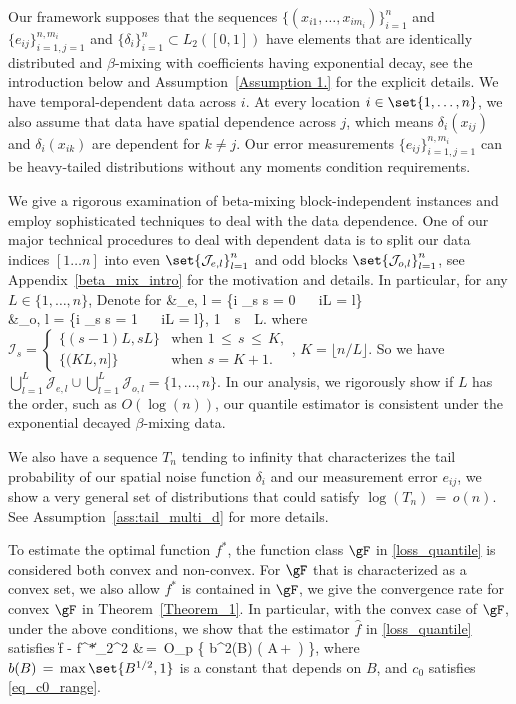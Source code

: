\documentclass[twoside,11pt]{article}
\begin{document}
Our framework supposes that the sequences $\{(x_{i1}, \dots, x_{im_i}) \}^{n}_{i=1}$ and $\{e_{ij}\}_{i=1,j=1}^{n,m_i}$ and $\{\delta_i\}_{i=1}^{n} \subset L_2([0,1])$ have elements that are identically distributed and $\beta$-mixing with coefficients having exponential decay, see the introduction below and Assumption~\ref{Assumption 1.} for the explicit details. We have temporal-dependent data across $i$. At every location $i \in \set{1, \dots, n}$, we also assume that data have spatial dependence across $j$, which means $\delta_i(x_{ij})$ and $\delta_i(x_{ik})$ are dependent for $k\neq j$.
Our error measurements $\{e_{ij}\}_{i=1,j=1}^{n,m_i}$ can be heavy-tailed distributions without any moments condition requirements. 

We give a rigorous examination
of beta-mixing block-independent instances and employ sophisticated techniques to deal with the data dependence. 
One of our major technical procedures to deal with dependent data is to split our data indices $[1\dots n]$ into even $\set{\mathcal{J}_{e,l}}_{l=1}^n$ and odd blocks $\set{\mathcal{J}_{o,l}}_{l=1}^n$, see Appendix~\ref{beta_mix_intro} for the motivation and details. 
In particular, for any \(L \in \{1, \ldots, n\}\), Denote for 
\beq
\label{odd_even_indices}
&_{e, l} = \{i \in {}_s  s = 0 \,\,\,\,\,\, i\mod L = l\} \,\,\,\,\,\, \\ 
&_{o, l} = \{i \in {}_s  s = 1 \,\,\,\,\,\, i\mod L = l\}, 1 \,\leq\, s \,\leq\, L. 
\beq 
where $
\mathcal{I}_s = 
\begin{cases}
\{ (s - 1)L, sL \} & \text{when } 1 \,\leq\, s \,\leq\, K, \\
\{ (KL, n] \} & \text{when } s = K + 1. \end{cases}
$, \(K = \lfloor n/L \rfloor\). So we have  
$\bigcup_{l=1}^L \mathcal{J}_{e,l} \cup \bigcup_{l=1}^L \mathcal{J}_{o,l} = \{1, \ldots, n\}.$ In our analysis, we rigorously show if $L$ has the order, such as $O(\log(n))$, our quantile estimator is consistent under the exponential decayed $\beta$-mixing data.  

We also have a sequence $T_n$ tending to infinity that characterizes the tail probability of our spatial noise function $\delta_i$ and our measurement error $e_{ij}$, we show a very general set of distributions that could satisfy $\log(T_n) \,=\, o(n)$. See Assumption~\ref{ass:tail_multi_d} for more details. 

To estimate the optimal function $f^*$, the function class $\gF$ in \eqref{loss_quantile} is considered both convex and non-convex. 
For $\gF$ that is characterized as a convex set, we also allow $f^*$ is contained in $\gF$, 
we give the convergence rate for convex $\gF$ in Theorem~\ref{Theorem_1}. In particular, with the convex case of $\gF$, under the above conditions, we show that the estimator $\hat{f}$ in \eqref{loss_quantile} satisfies 
\bea 
\left\|\hat f - f^*\right\|_2^2 &\,=\, O_p \left\{ b^2(B) \left( A\,+\, \right) \right\},
\bea where $b(B) \,=\, \max\set{B^{1/2},1}$ is a constant that depends on $B$, and $c_0$ satisfies \eqref{eq_c0_range}. 
 
\end{document}
